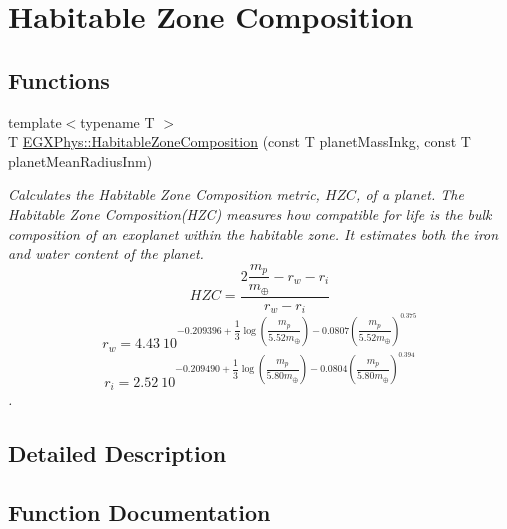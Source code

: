 \hypertarget{group___e_g_x_phys-_astrophysics-_habitable_zone_composition}{}\section{Habitable Zone Composition}
\label{group___e_g_x_phys-_astrophysics-_habitable_zone_composition}
\subsection*{Functions}
\begin{DoxyCompactItemize}
\item 
{\footnotesize template$<$typename T $>$ }\\T \mbox{\hyperlink{group___e_g_x_phys-_astrophysics-_habitable_zone_composition_ga9fe32e7d12b68d2596a0a8409681acdc}{E\+G\+X\+Phys\+::\+Habitable\+Zone\+Composition}} (const T planet\+Mass\+Inkg, const T planet\+Mean\+Radius\+Inm)
\begin{DoxyCompactList}\small\item\em Calculates the Habitable Zone Composition metric, $HZC$, of a planet. The Habitable Zone Composition(\+H\+Z\+C) measures how compatible for life is the bulk composition of an exoplanet within the habitable zone. It estimates both the iron and water content of the planet. \[ HZC= \dfrac{ 2\dfrac{m_p}{m_{\oplus}} - r_w - r_i } { r_w - r_i } \] \[ r_w= 4.43\ 10^{ -0.209396 + \dfrac{1}{3}\log \left ( \dfrac{m_p}{5.52 m_\oplus} \right ) - 0.0807 \left ( \dfrac{m_p}{5.52 m_\oplus} \right )^{0.375}} \] \[ r_i= 2.52\ 10^{ -0.209490 + \dfrac{1}{3}\log \left ( \dfrac{m_p}{5.80 m_\oplus} \right ) - 0.0804 \left ( \dfrac{m_p}{5.80 m_\oplus} \right )^{0.394}} \]. \end{DoxyCompactList}\end{DoxyCompactItemize}


\subsection{Detailed Description}


\subsection{Function Documentation}
\mbox{\label{group___e_g_x_phys-_astrophysics-_habitable_zone_composition_ga9fe32e7d12b68d2596a0a8409681acdc}} 
